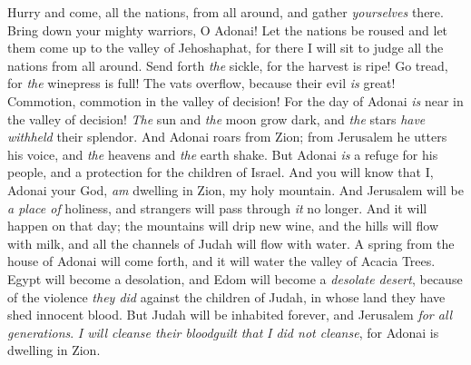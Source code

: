 \begin{biblechapter}
\verse Hurry and come, 
all the nations, from all around, 
and gather \textit{yourselves} there. 
Bring down your mighty warriors, O Adonai!
\verse Let the nations be roused and let them come up 
to the valley of Jehoshaphat, 
for there I will sit to judge 
all the nations from all around.
\verse Send forth \textit{the} sickle, 
for the harvest is ripe! 
Go tread, 
for \textit{the} winepress is full! 
The vats overflow, 
because their evil \textit{is} great!
\verse Commotion, commotion 
in the valley of decision! 
For the day of Adonai \textit{is} near 
in the valley of decision!
\verse \textit{The} sun and \textit{the} moon grow dark, 
and \textit{the} stars \textit{have withheld} their splendor.
\verse And Adonai roars from Zion; 
from Jerusalem he utters his voice, 
and \textit{the} heavens and \textit{the} earth shake. 
But Adonai \textit{is} a refuge for his people, 
and a protection for the children of Israel.
\verse And you will know that I, Adonai your God, 
\textit{am} dwelling in Zion, my holy mountain. 
And Jerusalem will be \textit{a place of} holiness, 
and strangers will pass through \textit{it} no longer.
\verse And it will happen on that day; 
the mountains will drip new wine, 
and the hills will flow with milk, 
and all the channels of Judah will flow with water. 
A spring from the house of Adonai will come forth, 
and it will water the valley of Acacia Trees.
\verse Egypt will become a desolation, 
and Edom will become a \textit{desolate desert}, 
because of the violence \textit{they did} against the children of Judah, 
in whose land they have shed innocent blood.
\verse But Judah will be inhabited forever, 
and Jerusalem \textit{for all generations}.
\verse \textit{I will cleanse their bloodguilt} \textit{that} \textit{I did not cleanse}, 
for Adonai is dwelling in Zion.
\end{biblechapter}

